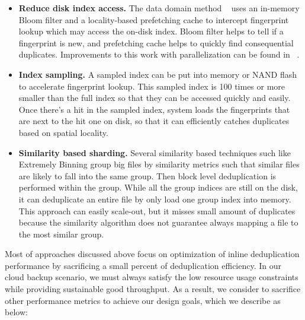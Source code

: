\begin{itemize}
\item \textbf{Reduce disk index access.} The data domain method ~\cite{bottleneck08} 
uses an in-memory Bloom filter and a locality-based prefetching cache to intercept fingerprint lookup which may
access the on-disk index. Bloom filter\cite{Bonomi2006} helps to tell if a fingerprint is new, and prefetching cache
helps to quickly find consequential duplicates. Improvements to this work with parallelization can be found
 in ~\cite{MAD210,DEBAR,nath08}.
\item \textbf{Index sampling.} A sampled index can be 
put into memory\cite{sparseindex09} or NAND flash\cite{Guo2011} to accelerate fingerprint lookup. 
This sampled index is 100 times or more smaller than the full index so that 
they can be accessed quickly and easily.
Once there's a hit in the sampled index, system loads the fingerprints that are next to the hit one on disk,
so that it can efficiently catches duplicates based on spatial locality.
\item \textbf{Similarity based sharding.} Several similarity based techniques\cite{shingling97} such like 
Extremely Binning\cite{extreme_binning09, Dong2011, Srinivasan2012, chord01} group big files by similarity metrics
such that similar files are likely to fall into the same group. Then block level deduplication is performed
within the group. While all the group indices are still on the disk, it can deduplicate an entire file
by only load one group index into memory. This approach can easily scale-out, but it misses small amount of duplicates 
because the similarity algorithm does not guarantee always mapping a file to the most similar group.
\end{itemize}

Most of approaches discussed above focus on optimization of inline deduplication
performance by sacrificing a small percent of deduplication efficiency.
In our cloud backup scenario, we must always satisfy the low resource usage constraints while 
providing sustainable good throughput. As a result, we consider to sacrifice other performance metrics 
to achieve our design goals, which we describe as below:


